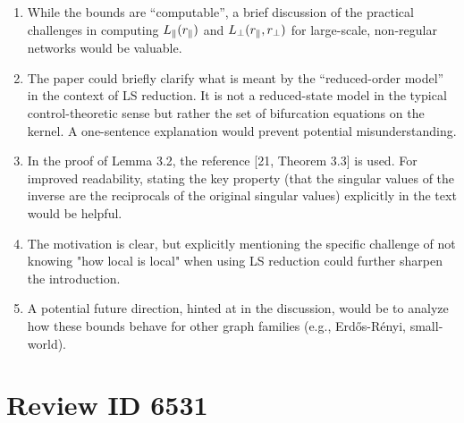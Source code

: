 \documentclass[letterpaper, 10 pt, conference]{ieeeconf}
\begin{document}
\begin{enumerate}
    \item While the bounds are ``computable'', a brief discussion of the practical challenges in computing \(L_{\parallel}(r_{\parallel})\) and \(L_{\perp}(r_{\parallel},r_{\perp})\) for large-scale, non-regular networks would be valuable. 
    \item The paper could briefly clarify what is meant by the ``reduced-order model'' in the context of LS reduction. It is not a reduced-state model in the typical control-theoretic sense but rather the set of bifurcation equations on the kernel. A one-sentence explanation would prevent potential misunderstanding. 
    \item In the proof of Lemma 3.2, the reference [21, Theorem 3.3] is used. For improved readability, stating the key property (that the singular values of the inverse are the reciprocals of the original singular values) explicitly in the text would be helpful. 
    \item The motivation is clear, but explicitly mentioning the specific challenge of not knowing "how local is local" when using LS reduction could further sharpen the introduction. 
    \item A potential future direction, hinted at in the discussion, would be to analyze how these bounds behave for other graph families (e.g., Erdős-Rényi, small-world). 
\end{enumerate}

\section{Review ID 6531}
\end{document}
